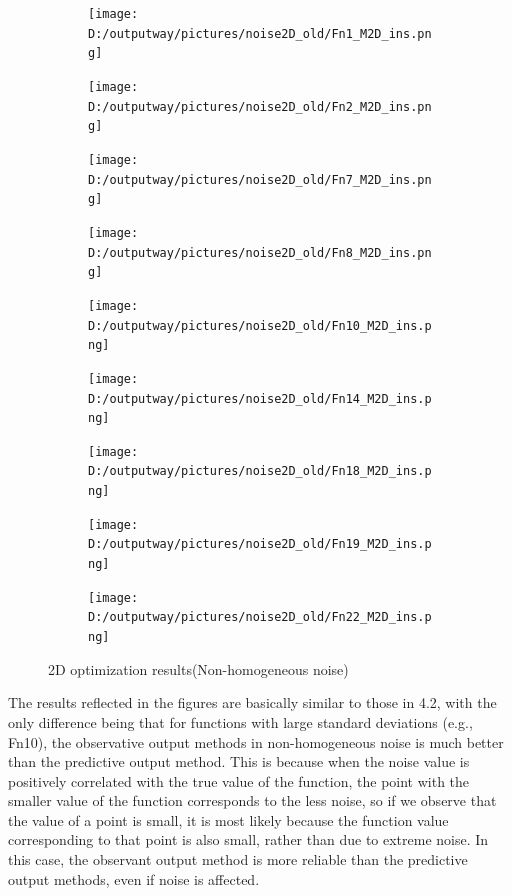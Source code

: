 \documentclass{article}
\begin{document}
\begin{figure}[H]
    \centering
    \begin{subfigure}[t]{.32\linewidth}
        \centering
        \texttt{[image: D:/outputway/pictures/noise2D\_old/Fn1\_M2D\_ins.png]}
    \end{subfigure}
    \begin{subfigure}[t]{.32\linewidth}
        \centering
        \texttt{[image: D:/outputway/pictures/noise2D\_old/Fn2\_M2D\_ins.png]}
    \end{subfigure}
    \begin{subfigure}[t]{.32\linewidth}
        \centering
        \texttt{[image: D:/outputway/pictures/noise2D\_old/Fn7\_M2D\_ins.png]}
    \end{subfigure}
    \begin{subfigure}[t]{.32\linewidth}
        \centering
        \texttt{[image: D:/outputway/pictures/noise2D\_old/Fn8\_M2D\_ins.png]}
    \end{subfigure}
    \begin{subfigure}[t]{.32\linewidth}
        \centering
        \texttt{[image: D:/outputway/pictures/noise2D\_old/Fn10\_M2D\_ins.png]}
    \end{subfigure}
    \begin{subfigure}[t]{.32\linewidth}
        \centering
        \texttt{[image: D:/outputway/pictures/noise2D\_old/Fn14\_M2D\_ins.png]}
    \end{subfigure}
    \begin{subfigure}[t]{.32\linewidth}
        \centering
        \texttt{[image: D:/outputway/pictures/noise2D\_old/Fn18\_M2D\_ins.png]}
    \end{subfigure}
    \begin{subfigure}[t]{.32\linewidth}
        \centering
        \texttt{[image: D:/outputway/pictures/noise2D\_old/Fn19\_M2D\_ins.png]}
    \end{subfigure}
    \begin{subfigure}[t]{.32\linewidth}
        \centering
        \texttt{[image: D:/outputway/pictures/noise2D\_old/Fn22\_M2D\_ins.png]}
    \end{subfigure}
    \caption{2D optimization results(Non-homogeneous noise)}
    \label{Fig4}
\end{figure}

The results reflected in the figures are basically similar to those in 4.2, with the only difference being that for functions with large standard deviations (e.g., Fn10), the observative output methods in non-homogeneous noise is much better than the predictive output method. This is because when the noise value is positively correlated with the true value of the function, the point with the smaller value of the function corresponds to the less noise, so if we observe that the value of a point is small, it is most likely because the function value corresponding to that point is also small, rather than due to extreme noise. In this case, the observant output method is more reliable than the predictive output methods, even if noise is affected.
\end{document}

